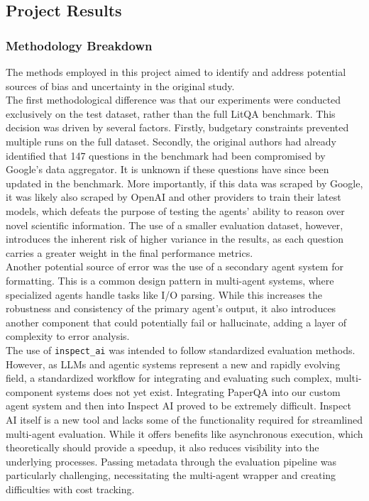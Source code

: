 \subsection{Project Results}

\subsubsection{Methodology Breakdown}
The methods employed in this project aimed to identify and address potential sources of bias and uncertainty in the original study. \\

The first methodological difference was that our experiments were conducted exclusively on the test dataset, rather than the full LitQA benchmark. This decision was driven by several factors. Firstly, budgetary constraints prevented multiple runs on the full dataset. Secondly, the original authors had already identified that 147 questions in the benchmark had been compromised by Google's data aggregator. It is unknown if these questions have since been updated in the benchmark. More importantly, if this data was scraped by Google, it was likely also scraped by OpenAI and other providers to train their latest models, which defeats the purpose of testing the agents' ability to reason over novel scientific information. The use of a smaller evaluation dataset, however, introduces the inherent risk of higher variance in the results, as each question carries a greater weight in the final performance metrics. \\

Another potential source of error was the use of a secondary agent system for formatting. This is a common design pattern in multi-agent systems, where specialized agents handle tasks like I/O parsing. While this increases the robustness and consistency of the primary agent's output, it also introduces another component that could potentially fail or hallucinate, adding a layer of complexity to error analysis. \\

The use of \texttt{inspect\_ai} was intended to follow standardized evaluation methods. However, as LLMs and agentic systems represent a new and rapidly evolving field, a standardized workflow for integrating and evaluating such complex, multi-component systems does not yet exist. Integrating PaperQA into our custom agent system and then into Inspect AI proved to be extremely difficult. Inspect AI itself is a new tool and lacks some of the functionality required for streamlined multi-agent evaluation. While it offers benefits like asynchronous execution, which theoretically should provide a speedup, it also reduces visibility into the underlying processes. Passing metadata through the evaluation pipeline was particularly challenging, necessitating the multi-agent wrapper and creating difficulties with cost tracking. \\

